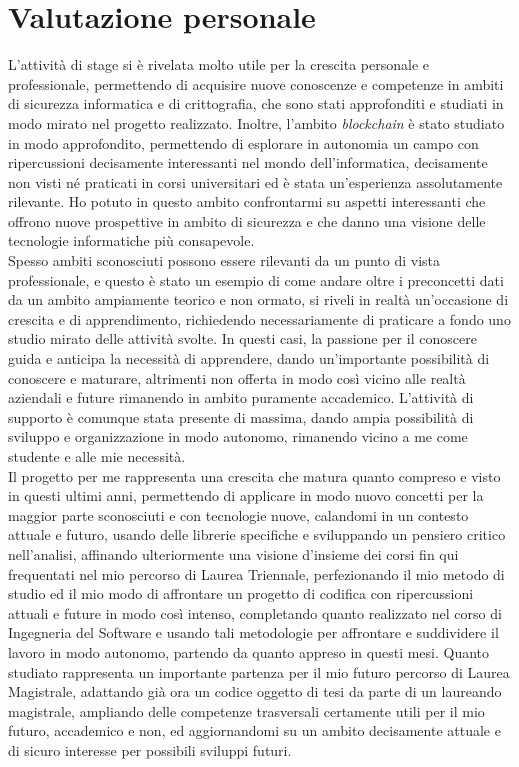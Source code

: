 \section{Valutazione personale}\label{sec:conclusioni-valutazione}

L'attività di stage si è rivelata molto utile per la crescita personale e professionale, permettendo di acquisire nuove conoscenze
e competenze in ambiti di sicurezza informatica e di crittografia, che sono stati approfonditi e studiati in modo mirato nel progetto realizzato.
Inoltre, l'ambito \textit{blockchain} è stato studiato in modo approfondito, permettendo di esplorare in autonomia un campo con ripercussioni
decisamente interessanti nel mondo dell'informatica, decisamente non visti né praticati in corsi universitari ed è stata un'esperienza assolutamente rilevante. 
Ho potuto in questo ambito confrontarmi su aspetti interessanti che offrono nuove prospettive in ambito di sicurezza e che danno una visione delle tecnologie informatiche più consapevole. \\

Spesso ambiti sconosciuti possono essere rilevanti da un punto di vista professionale, e questo è stato un esempio di come
andare oltre i preconcetti dati da un ambito ampiamente teorico e non ormato, si riveli in realtà un'occasione di crescita
e di apprendimento, richiedendo necessariamente di praticare a fondo uno studio mirato delle attività svolte. 
In questi casi, la passione per il conoscere guida e anticipa la necessità di apprendere, dando un'importante possibilità di conoscere e maturare,
altrimenti non offerta in modo così vicino alle realtà aziendali e future rimanendo in ambito puramente accademico.
L'attività di supporto è comunque stata presente di massima, dando ampia possibilità di sviluppo e organizzazione in modo autonomo, 
rimanendo vicino a me come studente e alle mie necessità. \\

Il progetto per me rappresenta una crescita che matura quanto compreso e visto in questi ultimi anni, permettendo di applicare in modo nuovo 
concetti per la maggior parte sconosciuti e con tecnologie nuove, calandomi in un contesto attuale e futuro, usando delle librerie specifiche e sviluppando un
pensiero critico nell'analisi, affinando ulteriormente una visione d'insieme dei corsi fin qui frequentati nel mio percorso di Laurea Triennale, perfezionando il mio metodo di studio 
ed il mio modo di affrontare un progetto di codifica con ripercussioni attuali e future in modo così intenso, completando quanto realizzato nel corso di Ingegneria del Software
e usando tali metodologie per affrontare e suddividere il lavoro in modo autonomo, partendo da quanto appreso in questi mesi.
Quanto studiato rappresenta un importante partenza per il mio futuro percorso di Laurea Magistrale, adattando già ora un codice oggetto di tesi da parte di un laureando magistrale,
ampliando delle competenze trasversali certamente utili per il mio futuro, accademico e non, ed aggiornandomi su un ambito decisamente attuale e di sicuro interesse per possibili sviluppi futuri.
